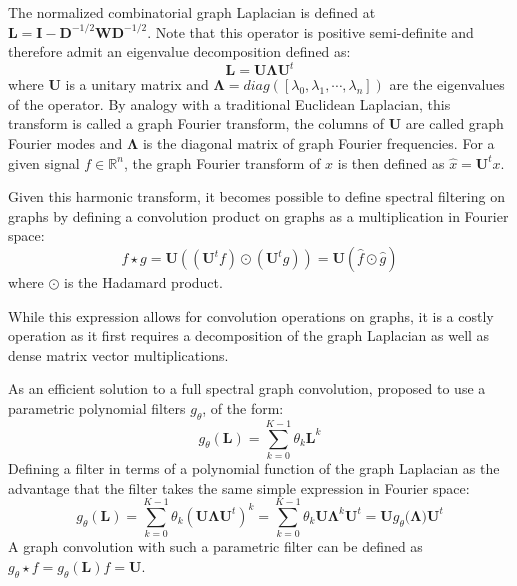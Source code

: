 \documentclass[a4paper,fleqn,usenatbib]{mnras}
\begin{document}
The normalized combinatorial graph  Laplacian is defined at $\mathbf{L} = \mathbf{I} - \mathbf{D}^{-1/2} \mathbf{W} \mathbf{D}^{-1/2}$. Note that this operator is positive semi-definite and therefore  admit an eigenvalue decomposition defined as:
\begin{equation}
	\mathbf{L} = \mathbf{U} \mathbf{\Lambda} \mathbf{U}^t
\end{equation}
where $\mathbf{U}$ is a unitary matrix and $\mathbf{\Lambda} = diag([\lambda_0, \lambda_1, \cdots, \lambda_n])$ are the eigenvalues  of the operator. By analogy with a traditional Euclidean Laplacian, this transform is called a graph Fourier transform, the columns of $\mathbf{U}$ are called graph Fourier modes  and $\mathbf{\Lambda}$ is the diagonal matrix of graph Fourier frequencies. For a given signal $f \in \mathbb{R}^n$, the graph Fourier transform of $x$ is then defined as $\hat{x} = \mathbf{U}^t x$. 

Given this  harmonic transform, it becomes possible to define spectral filtering on graphs by defining a convolution product on graphs as a multiplication in Fourier space:
\begin{equation}
	f  \star g = \mathbf{U} \left( ( \mathbf{U}^t f) \odot  ( \mathbf{U}^t g ) \right) = \mathbf{U} \left(  \hat{f} \odot \hat{g} \right)
\end{equation}
where $\odot$ is the Hadamard product.

While this expression allows for convolution operations  on graphs, it is a costly operation as it first requires a decomposition of the  graph Laplacian as well as dense matrix vector multiplications. 

As an efficient solution to a  full spectral graph  convolution, \cite{Defferrard2016} proposed to use a parametric polynomial filters $g_\theta$, of the form:
\begin{equation}
	g_\theta(\mathbf{L}) = \sum_{k=0}^{K-1} \theta_k \mathbf{L}^k
\end{equation}
Defining a filter in  terms of a polynomial function of the graph Laplacian as the advantage that the filter takes the same simple expression in Fourier space: 
\begin{equation}
	g_\theta(\mathbf{L}) =  \sum_{k=0}^{K-1} \theta_k (\mathbf{U} \mathbf{\Lambda}  \mathbf{U}^t)^k  = \sum_{k=0}^{K-1} \theta_k \mathbf{U} \mathbf{\Lambda}^k \mathbf{U}^t =  \mathbf{U}  g_\theta(\mathbf{\Lambda)} \mathbf{U}^t 
\end{equation}
A graph convolution with such a parametric filter can be defined as $g_\theta \star f = g_\theta(\mathbf{L}) f = \mathbf{U} $.
\end{document}
